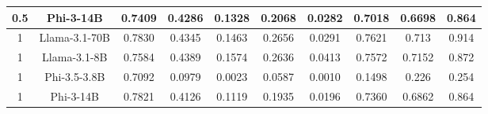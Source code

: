 \documentclass[11pt]{article}
\begin{document}
\begin{table}[htbp]
{\begin{tabular}{|c|c|c|c|c|c|c|c|c|c|}
0.5                  & Phi-3-14B               & 0.7409              & 0.4286           & 0.1328           & 0.2068           & 0.0282        & 0.7018          & 0.6698          & 0.864           \\ \hline
1                    & Llama-3.1-70B           & 0.7830              & 0.4345           & 0.1463           & 0.2656           & 0.0291        & 0.7621          & 0.713           & 0.914           \\ \hline
1                    & Llama-3.1-8B            & 0.7584              & 0.4389           & 0.1574           & 0.2636           & 0.0413        & 0.7572          & 0.7152          & 0.872           \\ \hline
1                    & Phi-3.5-3.8B            & 0.7092              & 0.0979           & 0.0023           & 0.0587           & 0.0010        & 0.1498          & 0.226           & 0.254           \\ \hline
1                    & Phi-3-14B               & 0.7821              & 0.4126           & 0.1119           & 0.1935           & 0.0196        & 0.7360          & 0.6862          & 0.864           \\ \hline
\end{tabular}
}
\end{table}
\end{document}
